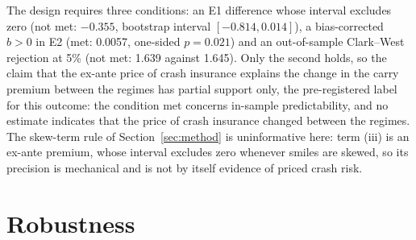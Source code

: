 \documentclass[11pt]{article}
\theoremstyle{result}
\begin{document}
The design requires three conditions: an E1 difference whose interval excludes zero (not met: $-0.355$, bootstrap interval $[-0.814,0.014]$), a bias-corrected $b>0$ in E2 (met: 0.0057, one-sided $p=0.021$) and an out-of-sample Clark--West rejection at 5\% (not met: 1.639 against 1.645). Only the second holds, so the claim that the ex-ante price of crash insurance explains the change in the carry premium between the regimes has partial support only, the pre-registered label for this outcome: the condition met concerns in-sample predictability, and no estimate indicates that the price of crash insurance changed between the regimes. The skew-term rule of Section~\ref{sec:method} is uninformative here: term (iii) is an ex-ante premium, whose interval excludes zero whenever smiles are skewed, so its precision is mechanical and is not by itself evidence of priced crash risk.

\section{Robustness}\label{sec:robust}
\end{document}
